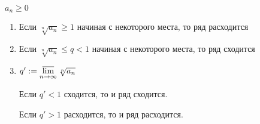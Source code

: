 \begin{theorem}\thmslashn
	
	$a_n \ge 0$
	
	\begin{enumerate}
		\item Если $\sqrt[n]{a_n} \ge 1$ начиная с некоторого места, то ряд расходится
		\item Если $\sqrt[n]{a_n} \le q < 1$ начиная с некоторого места, то ряд сходится
		\item $q' := \varlimsup\limits_{n \to \infty} \sqrt[n]{a_n}$
		
		Если $q' < 1$ сходится, то и ряд сходится.
		
		Если $q' > 1$ расходится, то и ряд расходится.
	\end{enumerate}
\end{theorem}

